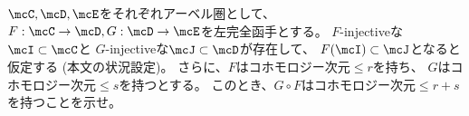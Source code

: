 \documentclass[uplatex,dvipdfmx]{jsarticle}
\begin{document}
\maketitle\HeaderCommentA
\section{}
\fi



\begin{prob}\label{1.20}
  \(\mcC,\mcD,\mcE\)をそれぞれアーベル圏として、
  \(F:\mcC\to \mcD, G:\mcD\to \mcE\)を左完全函手とする。
  \(F\)-injectiveな\(\mcI\subset \mcC\)と
  \(G\)-injectiveな\(\mcJ\subset \mcD\)が存在して、
  \(F(\mcI)\subset \mcJ\)となると仮定する
  (本文\cite[Proposition 1.8.7]{kashiwara2002sheaves}の状況設定)。
  さらに、\(F\)はコホモロジー次元\(\leq r\)を持ち、
  \(G\)はコホモロジー次元\(\leq s\)を持つとする。
  このとき、\(G\circ F\)はコホモロジー次元\(\leq r+s\)を持つことを示せ。
\end{prob}
\end{document}

